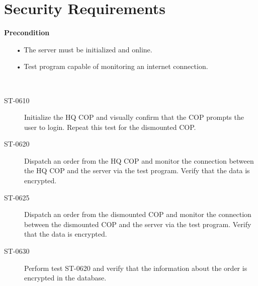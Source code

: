 \section{Security Requirements}
\textbf{Precondition}
\begin{itemize}
  \item[•] The server must be initialized and online.
  \item[•] Test program capable of monitoring an internet connection.
\end{itemize}
~\

\begin{description}
\item[ST-0610] Initialize the HQ COP and visually confirm that the COP prompts the user to login. Repeat this test for the dismounted COP.
\item[ST-0620] Dispatch an order from the HQ COP and monitor the connection between the HQ COP and the server via the test program. Verify that the data is encrypted. 
\item[ST-0625] Dispatch an order from the dismounted COP and monitor the connection between the dismounted COP and the server via the test program. Verify that the data is encrypted. 
\item[ST-0630] Perform test ST-0620 and verify that the information about the order is encrypted in the database.
\end{description}